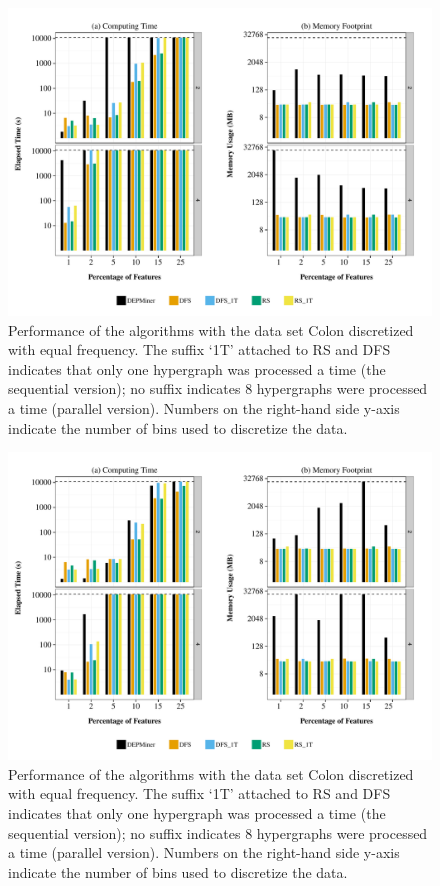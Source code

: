\documentclass[12pt,a4paper]{article}
\begin{document}
\begin{figure}
\begin{center}
\includegraphics[scale=0.65]{colon_ef}
\end{center}
\caption{Performance of the algorithms with the data set Colon discretized with equal frequency.
The suffix `1T' attached to RS and DFS indicates that only one hypergraph was processed a time (the
sequential version); no suffix indicates 8 hypergraphs were processed a time (parallel version).
Numbers on the right-hand side y-axis indicate the number of bins used to discretize the data.}
\label{qcep:fig:colonef}
\end{figure}

\begin{figure}
\begin{center}
\includegraphics[scale=0.65]{colon_ew}
\end{center}
\caption{Performance of the algorithms with the data set Colon discretized with equal frequency.
The suffix `1T' attached to RS and DFS indicates that only one hypergraph was processed a time (the
sequential version); no suffix indicates 8 hypergraphs were processed a time (parallel version).
Numbers on the right-hand side y-axis indicate the number of bins used to discretize the data.}
\label{qcep:fig:colonef}
\end{figure}
\end{document}
